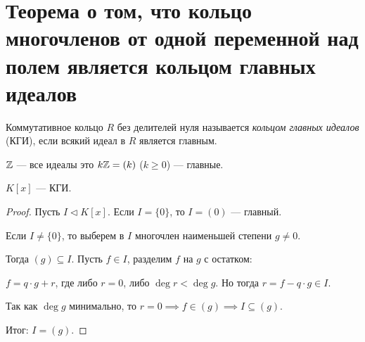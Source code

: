 \section{Теорема о том, что кольцо многочленов от одной переменной над полем является кольцом главных идеалов}

\begin{definition}
    Коммутативное кольцо $R$ без делителей нуля называется \textit{кольцом главных идеалов} (КГИ), если всякий идеал в $R$ является главным.
\end{definition}

\begin{example}
    $\mathbb{Z}$ --- все идеалы это $k\mathbb{Z} = (k)$ ($k \geq 0$) --- главные.
\end{example}

\begin{proposal}
    $K[x]$ --- КГИ.
\end{proposal}

\begin{proof}
    Пусть $I \lhd K[x]$. Если $I = \{0\}$, то $I = (0)$ --- главный.

    Если $I \neq \{0\}$, то выберем в $I$ многочлен наименьшей степени $g \neq 0$.

    Тогда $(g) \subseteq I$. Пусть $f \in I$, разделим $f$ на $g$ с остатком:

    $f = q \cdot g + r$, где либо $r = 0$, либо $\deg r < \deg g$. Но тогда $r = f - q \cdot g \in I$.

    Так как $\deg g$ минимально, то $r = 0 \implies f \in (g) \implies I \subseteq (g)$.

    Итог: $I = (g)$.
\end{proof}
